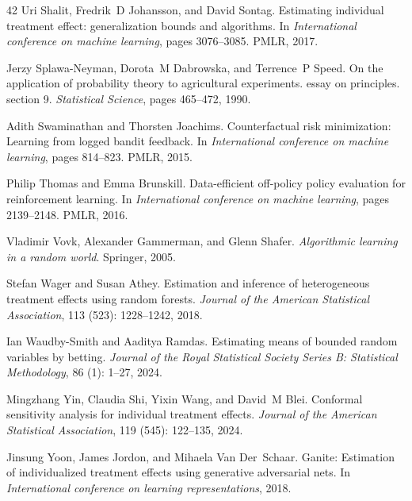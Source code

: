 \documentclass{article}
\theoremstyle{plain}
\theoremstyle{definition}
\theoremstyle{remark}
\begin{document}
\begin{thebibliography}{42}
Uri Shalit, Fredrik~D Johansson, and David Sontag.
\newblock Estimating individual treatment effect: generalization bounds and algorithms.
\newblock In \emph{International conference on machine learning}, pages 3076--3085. PMLR, 2017.

Jerzy Splawa-Neyman, Dorota~M Dabrowska, and Terrence~P Speed.
\newblock On the application of probability theory to agricultural experiments. essay on principles. section 9.
\newblock \emph{Statistical Science}, pages 465--472, 1990.

Adith Swaminathan and Thorsten Joachims.
\newblock Counterfactual risk minimization: Learning from logged bandit feedback.
\newblock In \emph{International conference on machine learning}, pages 814--823. PMLR, 2015.

Philip Thomas and Emma Brunskill.
\newblock Data-efficient off-policy policy evaluation for reinforcement learning.
\newblock In \emph{International conference on machine learning}, pages 2139--2148. PMLR, 2016.

Vladimir Vovk, Alexander Gammerman, and Glenn Shafer.
\newblock \emph{Algorithmic learning in a random world}.
\newblock Springer, 2005.

Stefan Wager and Susan Athey.
\newblock Estimation and inference of heterogeneous treatment effects using random forests.
\newblock \emph{Journal of the American Statistical Association}, 113 (523): 1228--1242, 2018.

Ian Waudby-Smith and Aaditya Ramdas.
\newblock Estimating means of bounded random variables by betting.
\newblock \emph{Journal of the Royal Statistical Society Series B: Statistical Methodology}, 86 (1): 1--27, 2024.

Mingzhang Yin, Claudia Shi, Yixin Wang, and David~M Blei.
\newblock Conformal sensitivity analysis for individual treatment effects.
\newblock \emph{Journal of the American Statistical Association}, 119 (545): 122--135, 2024.

Jinsung Yoon, James Jordon, and Mihaela Van Der~Schaar.
\newblock Ganite: Estimation of individualized treatment effects using generative adversarial nets.
\newblock In \emph{International conference on learning representations}, 2018.

\end{thebibliography}
\end{document}
